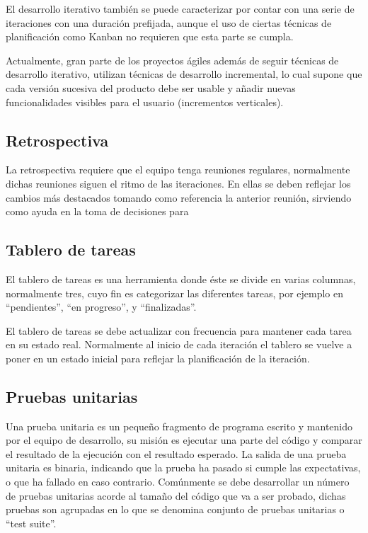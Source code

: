 El desarrollo iterativo también se puede caracterizar por contar con una serie de iteraciones con una duración prefijada, aunque el uso de ciertas técnicas de planificación como Kanban no requieren que esta parte se cumpla.

Actualmente, gran parte de los proyectos ágiles además de seguir técnicas de desarrollo iterativo, utilizan técnicas de desarrollo incremental, lo cual supone que cada versión sucesiva del producto debe ser usable y añadir nuevas funcionalidades visibles para el usuario (incrementos verticales).

\subsection{Retrospectiva}

La retrospectiva requiere que el equipo tenga reuniones regulares, normalmente dichas reuniones siguen el ritmo de las iteraciones. En ellas se deben reflejar los cambios más destacados tomando como referencia la anterior reunión, sirviendo como ayuda en la toma de decisiones para 

\subsection{Tablero de tareas}

El tablero de tareas es una herramienta donde éste se divide en varias columnas, normalmente tres, cuyo fin es categorizar las diferentes tareas, por ejemplo en ``pendientes'', ``en progreso'', y ``finalizadas''.

El tablero de tareas se debe actualizar con frecuencia para mantener cada tarea en su estado real. Normalmente al inicio de cada iteración el tablero se vuelve a poner en un estado inicial para reflejar la planificación de la iteración.

\subsection{Pruebas unitarias}

Una prueba unitaria es un pequeño fragmento de programa escrito y mantenido por el equipo de desarrollo, su misión es ejecutar una parte del código y comparar el resultado de la ejecución con el resultado esperado. La salida de una prueba unitaria es binaria, indicando que la prueba ha pasado si cumple las expectativas, o que ha fallado en caso contrario. Comúnmente se debe desarrollar un número de pruebas unitarias acorde al tamaño del código que va a ser probado, dichas pruebas son agrupadas en lo que se denomina conjunto de pruebas unitarias o ``test suite''.

